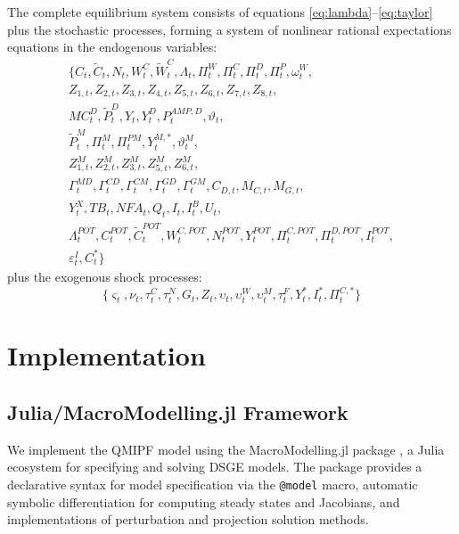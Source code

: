 \documentclass[12pt]{article}
\begin{document}
The complete equilibrium system consists of equations \eqref{eq:lambda}--\eqref{eq:taylor} plus the stochastic processes, forming a system of nonlinear rational expectations equations in the endogenous variables:
\begin{multline*}
\{ C_t, \tilde{C}_t, N_t, W_t^C, \tilde{W}_t^C, \Lambda_t, \Pi_t^W, \Pi_t^C, \Pi_t^D, \Pi_t^P, \omega_t^W, \\
Z_{1,t}, Z_{2,t}, Z_{3,t}, Z_{4,t}, Z_{5,t}, Z_{6,t}, Z_{7,t}, Z_{8,t}, \\
MC_t^D, \tilde{P}_t^D, Y_t, Y_t^D, P_t^{AMP,D}, \vartheta_t, \\
\tilde{P}_t^M, \Pi_t^M, \Pi_t^{PM}, Y_t^{M,*}, \vartheta_t^M, \\
Z_{1,t}^M, Z_{2,t}^M, Z_{3,t}^M, Z_{5,t}^M, Z_{6,t}^M, \\
\Gamma_t^{MD}, \Gamma_t^{CD}, \Gamma_t^{CM}, \Gamma_t^{GD}, \Gamma_t^{GM}, C_{D,t}, M_{C,t}, M_{G,t}, \\
Y_t^X, TB_t, NFA_t, Q_t, I_t, I_t^B, U_t, \\
\Lambda_t^{POT}, C_t^{POT}, \tilde{C}_t^{POT}, W_t^{C,POT}, N_t^{POT}, Y_t^{POT}, \Pi_t^{C,POT}, \Pi_t^{D,POT}, I_t^{POT}, \\
\varepsilon_t^I, C_t^* \}
\end{multline*}
plus the exogenous shock processes:
\[
\{ \varsigma_t, \nu_t, \tau_t^C, \tau_t^N, G_t, Z_t, \upsilon_t, \upsilon_t^W, \upsilon_t^M, \tau_t^F, Y_t^*, I_t^*, \Pi_t^{C,*} \}
\]

\section{Implementation}\label{sec:implementation}

\subsection{Julia/MacroModelling.jl Framework}

We implement the QMIPF model using the MacroModelling.jl package \citep{MacroModellingJL}, a Julia ecosystem for specifying and solving DSGE models. The package provides a declarative syntax for model specification via the \texttt{@model} macro, automatic symbolic differentiation for computing steady states and Jacobians, and implementations of perturbation and projection solution methods.
\end{document}
